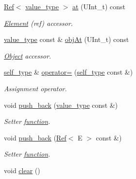 \begin{DoxyCompactItemize}
\hyperlink{classpanda_1_1Ref}{Ref}$<$ \hyperlink{classpanda_1_1RefVector_ac553f3b6060e39d4418982e1a121d513}{value\_\-type} $>$ \hyperlink{classpanda_1_1RefVector_a38b88c25cf18683ec933d6936d4b3abc}{at} (UInt\_\-t) const 
\begin{DoxyCompactList}\small\item\em \hyperlink{classpanda_1_1Element}{Element} (ref) accessor. \item\end{DoxyCompactList}\item 
\hyperlink{classpanda_1_1RefVector_ac553f3b6060e39d4418982e1a121d513}{value\_\-type} const \& \hyperlink{classpanda_1_1RefVector_aac3407b681f83ec3ec19009c564b94ab}{objAt} (UInt\_\-t) const 
\begin{DoxyCompactList}\small\item\em \hyperlink{classpanda_1_1Object}{Object} accessor. \item\end{DoxyCompactList}\item 
\hyperlink{classpanda_1_1RefVector}{self\_\-type} \& \hyperlink{classpanda_1_1RefVector_a8c6589a33d3c659522c94de51af29f6e}{operator=} (\hyperlink{classpanda_1_1RefVector}{self\_\-type} const \&)
\begin{DoxyCompactList}\small\item\em Assignment operator. \item\end{DoxyCompactList}\item 
void \hyperlink{classpanda_1_1RefVector_a8ab84690e691574c7ec1d908f87d3bef}{push\_\-back} (\hyperlink{classpanda_1_1RefVector_ac553f3b6060e39d4418982e1a121d513}{value\_\-type} const \&)
\begin{DoxyCompactList}\small\item\em Setter \hyperlink{namespacepanda_1_1function}{function}. \item\end{DoxyCompactList}\item 
void \hyperlink{classpanda_1_1RefVector_a7e4767b46e857db8d68c4493cd166b4f}{push\_\-back} (\hyperlink{classpanda_1_1Ref}{Ref}$<$ E $>$ const \&)
\begin{DoxyCompactList}\small\item\em Setter \hyperlink{namespacepanda_1_1function}{function}. \item\end{DoxyCompactList}\item 
void \hyperlink{classpanda_1_1RefVector_a15c08504ee8d0bbf2bbd514893b89fe6}{clear} ()

\end{DoxyCompactItemize}
